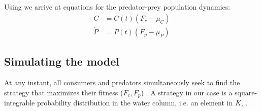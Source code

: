 Using  we arrive at equations for the predator-prey population dynamics:
\begin{equation}
  \begin{split}
	\dot{C} &= C(t)\left ( F_c - \mu_C \right ) \\
	\dot{P} &= P(t) \left ( F_p - \mu_P  \right )
\end{split}
  \label{eq:population_growth_prob_dens}
\end{equation}

\subsection{Simulating the model}




At any instant, all consumers and predators simultaneously seek to find the strategy that maximizes their fitness ($F_c, F_p$) . A strategy in our case is a square-integrable probability distribution in the water column, i.e. an element in $K$, .

